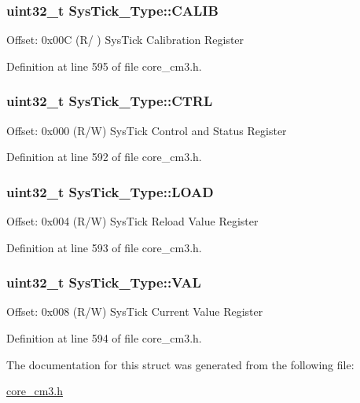 \subsubsection[{\texorpdfstring{C\+A\+L\+IB}{CALIB}}]{ uint32\+\_\+t Sys\+Tick\+\_\+\+Type\+::\+C\+A\+L\+IB}\hypertarget{structSysTick__Type_a9c9eda0ea6f6a7c904d2d75a6963e238}{}\label{structSysTick__Type_a9c9eda0ea6f6a7c904d2d75a6963e238}
Offset\+: 0x00C (R/ ) Sys\+Tick Calibration Register 

Definition at line 595 of file core\+\_\+cm3.\+h.

\subsubsection[{\texorpdfstring{C\+T\+RL}{CTRL}}]{ uint32\+\_\+t Sys\+Tick\+\_\+\+Type\+::\+C\+T\+RL}\hypertarget{structSysTick__Type_af2ad94ac83e5d40fc6e34884bc1bec5f}{}\label{structSysTick__Type_af2ad94ac83e5d40fc6e34884bc1bec5f}
Offset\+: 0x000 (R/W) Sys\+Tick Control and Status Register 

Definition at line 592 of file core\+\_\+cm3.\+h.

\subsubsection[{\texorpdfstring{L\+O\+AD}{LOAD}}]{ uint32\+\_\+t Sys\+Tick\+\_\+\+Type\+::\+L\+O\+AD}\hypertarget{structSysTick__Type_ae7bc9d3eac1147f3bba8d73a8395644f}{}\label{structSysTick__Type_ae7bc9d3eac1147f3bba8d73a8395644f}
Offset\+: 0x004 (R/W) Sys\+Tick Reload Value Register 

Definition at line 593 of file core\+\_\+cm3.\+h.

\subsubsection[{\texorpdfstring{V\+AL}{VAL}}]{ uint32\+\_\+t Sys\+Tick\+\_\+\+Type\+::\+V\+AL}\hypertarget{structSysTick__Type_a0997ff20f11817f8246e8f0edac6f4e4}{}\label{structSysTick__Type_a0997ff20f11817f8246e8f0edac6f4e4}
Offset\+: 0x008 (R/W) Sys\+Tick Current Value Register 

Definition at line 594 of file core\+\_\+cm3.\+h.



The documentation for this struct was generated from the following file\+:\begin{DoxyCompactItemize}
\item 
\hyperlink{core__cm3_8h}{core\+\_\+cm3.\+h}\end{DoxyCompactItemize}
